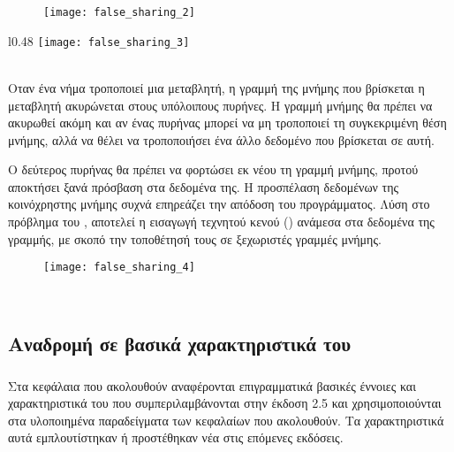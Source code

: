 \begin{figure}[h]
\texttt{[image: false\_sharing\_2]}
\centering
\captionsetup{justification=centering, singlelinecheck=false}
	\caption{}
\label{fig:false_sharing_2}
\end{figure}
\begin{wrapfigure}{l}{0.48\textwidth}
	\centering
	\texttt{[image: false\_sharing\_3]}
	\captionsetup{justification=centering, singlelinecheck=false}
	\caption{}
\label{fig:false_sharing_3}
\end{wrapfigure}
\ \\
Οταν ένα νήμα τροποποιεί μια μεταβλητή, η γραμμή της μνήμης που βρίσκεται η μεταβλητή ακυρώνεται στους υπόλοιπους
πυρήνες. Η γραμμή μνήμης θα πρέπει να ακυρωθεί ακόμη και αν ένας πυρήνας μπορεί να μη τροποποιεί τη συγκεκριμένη θέση
μνήμης, αλλά να θέλει να τροποποιήσει ένα άλλο δεδομένο που βρίσκεται σε αυτή. 

\clearpage

Ο δεύτερος πυρήνας θα πρέπει να φορτώσει εκ νέου τη γραμμή μνήμης, προτού αποκτήσει ξανά πρόσβαση στα δεδομένα της. Η
προσπέλαση δεδομένων της κοινόχρηστης μνήμης συχνά επηρεάζει την απόδοση του προγράμματος\cite{false_sharing}. Λύση στο
πρόβλημα του , αποτελεί η εισαγωγή τεχνητού κενού () ανάμεσα στα δεδομένα της γραμμής, με
σκοπό την τοποθέτησή τους σε ξεχωριστές γραμμές μνήμης.
\ \\

\begin{figure}[h]
    \centering
    \texttt{[image: false\_sharing\_4]}
    \captionsetup{justification=centering, singlelinecheck=false}
	\caption{}
    \label{fig:false_sharing_4}
\end{figure}
\ \\

\clearpage
\subsection{Αναδρομή σε βασικά χαρακτηριστικά του \emph{}}
\subparagraph{}
Στα κεφάλαια που ακολουθούν αναφέρονται επιγραμματικά βασικές έννοιες και χαρακτηριστικά του \emph{} που
συμπεριλαμβάνονται στην έκδοση 2.5 και χρησιμοποιούνται στα υλοποιημένα παραδείγματα των κεφαλαίων που ακολουθούν. Τα
χαρακτηριστικά αυτά εμπλουτίστηκαν ή προστέθηκαν νέα στις επόμενες εκδόσεις.
\ \\
